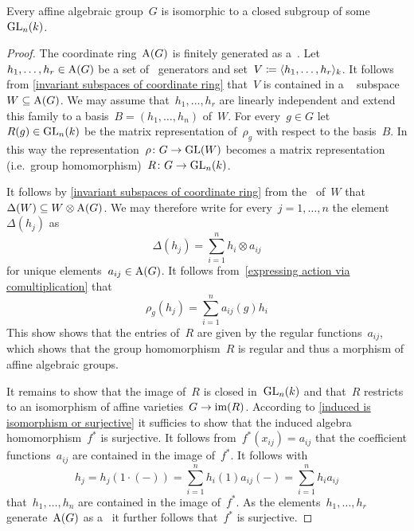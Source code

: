 \begin{theorem}
  \label{embedding theorem}
  Every affine algebraic group~$G$ is isomorphic to a closed subgroup of some~$\operatorname{GL}_n(k)$.
\end{theorem}


\begin{proof}
  \label{embedding theorem proof}
  The coordinate ring~$\operatorname{A}(G)$ is finitely generated as a~.
  Let~$h_1, \dotsc, h_r \in \operatorname{A}(G)$ be a set of~ generators and set~$V \coloneqq \langle h_1, \dotsc, h_r\rangle_k$.
  It follows from \cref{invariant subspaces of coordinate ring} that~$V$ is contained in a ~ subspace~$W \subseteq \operatorname{A}(G)$.
  We may assume that~$h_1, \dotsc, h_r$ are linearly independent and extend this family to a basis~$B = (h_1, \dotsc, h_n)$ of~$W$.
  For every~$g \in G$ let~$R(g) \in \operatorname{GL}_n(k)$ be the matrix representation of~$\rho_g$ with respect to the basis~$B$.
  In this way the representation~$\rho \colon G \to \operatorname{GL}(W)$ becomes a matrix representation (i.e.\ group homomorphism)~$R \colon G \to \operatorname{GL}_n(k)$.
  
  It follows by \cref{invariant subspaces of coordinate ring} from the~ of~$W$ that~$\Delta(W) \subseteq W \mathbin{\otimes} \operatorname{A}(G)$.
  We may therefore write for every~$j = 1, \dotsc, n$ the element~$\Delta(h_j)$ as
  \[
      \Delta(h_j)
    = \sum_{i=1}^n h_i \otimes a_{ij}
  \]
  for unique elements~$a_{ij} \in \operatorname{A}(G)$.
  It follows from~\eqref{expressing action via comultiplication} that
  \[
      \rho_g(h_j)
    = \sum_{i=1}^n a_{ij}(g) h_i
  \]
  This show shows that the entries of~$R$ are given by the regular functions~$a_{ij}$, which shows that the group homomorphism~$R$ is regular and thus a morphism of affine algebraic groups.
  
  It remains to show that the image of~$R$ is closed in~$\operatorname{GL}_n(k)$ and that~$R$ restricts to an isomorphism of affine varieties~$G \to \operatorname{im}(R)$.
  According to \cref{induced is isomorphism or surjective} it sufficies to show that the induced algebra homomorphism~$f^*$ is surjective.
  It follows from~$f^*(x_{ij}) = a_{ij}$ that the coefficient functions~$a_{ij}$ are contained in the image of~$f^*$.
  It follows with
  \[
      h_j
    = h_j(1 \cdot (-))
    = \sum_{i=1}^n h_i(1) a_{ij}(-)
    = \sum_{i=1}^n h_i a_{ij}
  \]
  that~$h_1, \dotsc, h_n$ are contained in the image of~$f^*$.
  As the elements~$h_1, \dotsc, h_r$ generate~$\operatorname{A}(G)$ as a~ it further follows that~$f^*$ is surjective.
\end{proof}


